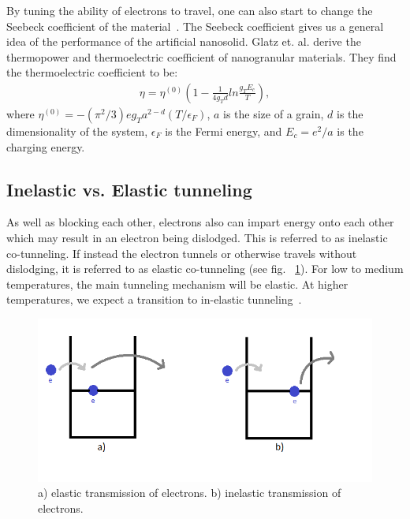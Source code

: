 By tuning the ability of electrons to travel, one can also start to change the Seebeck coefficient of the material~\cite{Glatz09}. The Seebeck coefficient gives us a general idea of the performance of the artificial nanosolid. Glatz et. al. derive the thermopower and thermoelectric coefficient of nanogranular materials. They find the thermoelectric coefficient to be:
\begin{eqnarray}
\eta = \eta^{(0)} (1 - \frac{1} {4 g_T d} ln \frac{g_T E_c} {T} ),
\label{thermoelectric}
\end{eqnarray}
where $\eta^{(0)} = -(\pi^2 / 3) e g_T a^{2-d} (T/ \epsilon_F)$, $a$ is the size of a grain, $d$ is the dimensionality of the system, $\epsilon_F$ is the Fermi energy, and $E_c = e^2 /a$ is the charging energy.

\subsection{Inelastic vs. Elastic tunneling}
As well as blocking each other, electrons also can impart energy onto each other which may result in an electron being dislodged. This is referred to as inelastic co-tunneling. If instead the electron tunnels or otherwise travels without dislodging, it is referred to as elastic co-tunneling (see fig. ~\ref{inelasticvselastic}). For low to medium temperatures, the main tunneling mechanism will be elastic. At higher temperatures, we expect a transition to in-elastic tunneling~\cite{Glazman05}.

\begin{figure}[htbp]
\begin{center}
\includegraphics[scale=.50]{inelasticvselastic.png}
\caption{a) elastic transmission of electrons. b) inelastic transmission of electrons.}
\label{inelasticvselastic}
\end{center}
\end{figure}


